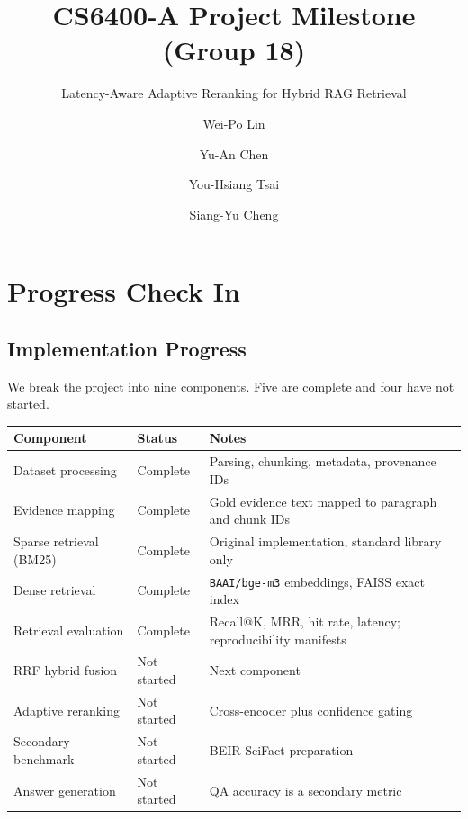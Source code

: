 \documentclass[sigconf,nonacm]{acmart}
\begin{document}
\title{CS6400-A Project Milestone (Group 18)}
\subtitle{Latency-Aware Adaptive Reranking for Hybrid RAG Retrieval}

\author{Wei-Po Lin}

\author{Yu-An Chen}

\author{You-Hsiang Tsai}

\author{Siang-Yu Cheng}

\maketitle

\section{Progress Check In}

\subsection{Implementation Progress}

We break the project into nine components. Five are complete and four have not
started.

\begin{table}[h]
\centering
\small
\begin{tabular}{@{}L{2.5cm}L{1.5cm}L{3.4cm}@{}}
\toprule
\textbf{Component} & \textbf{Status} & \textbf{Notes} \\
\midrule
Dataset processing      & Complete    & Parsing, chunking, metadata, provenance IDs \\
Evidence mapping        & Complete    & Gold evidence text mapped to paragraph and chunk IDs \\
Sparse retrieval (BM25) & Complete    & Original implementation, standard library only \\
Dense retrieval         & Complete    & \texttt{BAAI/bge-m3} embeddings, FAISS exact index \\
Retrieval evaluation    & Complete    & Recall@K, MRR, hit rate, latency; reproducibility manifests \\
RRF hybrid fusion       & Not started & Next component \\
Adaptive reranking      & Not started & Cross-encoder plus confidence gating \\
Secondary benchmark     & Not started & BEIR-SciFact preparation \\
Answer generation       & Not started & QA accuracy is a secondary metric \\
\bottomrule
\end{tabular}
\end{table}
\end{document}
